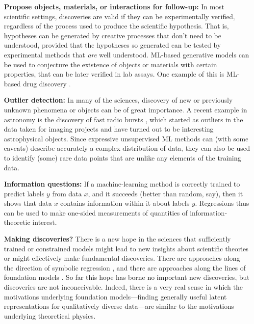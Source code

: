 \documentclass{article}
\renewcommand{\paragraph}[1]{\noindent\par\textbf{#1}}
\begin{document}
\paragraph{Propose objects, materials, or interactions for follow-up:}
In most scientific settings, discoveries are valid if they can be experimentally verified, regardless of the process used to produce the scientific hypothesis.
That is, hypotheses can be generated by creative processes that don't need to be understood, provided that the hypotheses so generated can be tested by experimental methods that \emph{are} well understood.
ML-based generative models can be used to conjecture the existence of objects or materials with certain properties, that can be later verified in lab assays.
One example of this is ML-based drug discovery \cite{kang2018conditional}. 

\paragraph{Outlier detection:}
In many of the sciences, discovery of new or previously unknown phenomena or objects can be of great importance.
A recent example in astronomy is the discovery of fast radio bursts \cite{frbs}, which started as outliers in the data taken for imaging projects and have turned out to be interesting astrophysical objects.
Since expressive unsupervised ML methods can (with some caveats) describe accurately a complex distribution of data, they can also be used to identify (some) rare data points that are unlike any elements of the training data.

\paragraph{Information questions:}
If a machine-learning method is correctly trained to predict labels $y$ from data $x$, and it succeeds (better than random, say), then it shows that data $x$ contains information within it about labels $y$.
Regressions thus can be used to make one-sided measurements of quantities of information-theoretic interest.

\paragraph{Making discoveries?}
There is a new hope in the sciences that sufficiently trained or constrained models might lead to new insights about scientific theories or might effectively make fundamental discoveries.
There are approaches along the direction of symbolic regression \cite{symbolic1, symbolic2}, and there are approaches along the lines of foundation models \cite{foundation1}.
So far this hope has borne no important new discoveries, but discoveries are not inconceivable.
Indeed, there is a very real sense in which the motivations underlying foundation models---finding generally useful latent representations for qualitatively diverse data---are similar to the motivations underlying theoretical physics.
\end{document}
